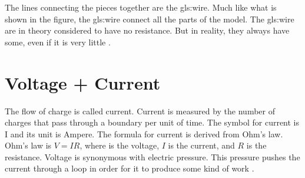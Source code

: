 \documentclass[../../Orator]{subfiles}
\begin{document}
The lines connecting the pieces together are the \gls{gls:wire}. Much like what is shown in the figure, the \gls{gls:wire} connect all the parts of the model. The \gls{gls:wire} are in theory considered to have no resistance. But in reality, they always have some, even if it is very little \cite{}. 


 \section{Voltage + Current}
The flow of charge is called current. Current is measured by the number of charges that pass through a boundary per unit of time. The symbol for current is I and its unit is Ampere. The formula for current is derived from Ohm's law. Ohm's law is \(V=IR\), where  is the voltage, \(I\) is the current, and \(R\) is the resistance. Voltage is synonymous with electric pressure. This pressure pushes the current through a loop in order for it to produce some kind of work \cite{}. 




\end{document}

